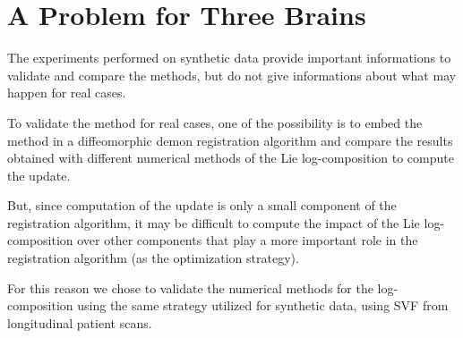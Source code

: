 \newpage

\section{A Problem for Three Brains}\label{se:three_brains} %
The experiments performed on synthetic data provide important informations to validate and compare the methods, but do not give informations about what may happen for real cases. 

To validate the method for real cases, one of the possibility is to embed the method in a diffeomorphic demon registration algorithm and compare the results obtained with different numerical methods of the Lie log-composition to compute the update.

But, since computation of the update is only a small component of the registration algorithm, it may be difficult to compute the impact of the Lie log-composition over other components that play a more important role in the registration algorithm (as the optimization strategy).

For this reason we chose to validate the numerical methods for the log-composition using the same strategy utilized for synthetic data, using SVF from longitudinal patient scans.

